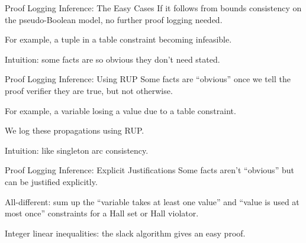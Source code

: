 \documentclass{beamer}
\begin{document}
\begin{frame}{Proof Logging Inference: The Easy Cases}
    If it follows from bounds consistency on the pseudo-Boolean model,
    no further proof logging needed.

    \bigskip

    For example, a tuple in a table constraint becoming infeasible.

    \bigskip

    Intuition: some facts are so obvious they don't need stated.
\end{frame}

\begin{frame}{Proof Logging Inference: Using RUP}
    Some facts are ``obvious'' once we tell the proof verifier they are true,
    but not otherwise.

    \bigskip

    For example, a variable losing a value due to a table constraint.

    \bigskip

    We log these propagations using RUP.

    \bigskip

    Intuition: like singleton arc consistency.
\end{frame}

\begin{frame}{Proof Logging Inference: Explicit Justifications}
    Some facts aren't ``obvious'' but can be justified explicitly.

    \bigskip

    All-different: sum up the ``variable takes at least one value'' and ``value is used at most once'' constraints for a Hall set or Hall violator.

    \bigskip

    Integer linear inequalities: the slack algorithm gives an easy proof.
\end{frame}
\end{document}
